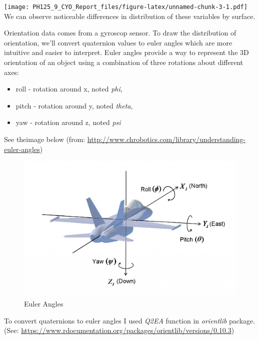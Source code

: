 \documentclass[]{article}
\providecommand{\tightlist}{%
  \setlength{\itemsep}{0pt}\setlength{\parskip}{0pt}}
\begin{document}
\texttt{[image: PH125\_9\_CYO\_Report\_files/figure-latex/unnamed-chunk-3-1.pdf]}
We can observe noticeable differences in distribution of these variables
by surface.

Orientation data comes from a gyroscop sensor. To draw the distribution
of orientation, we'll convert quaternion values to euler angles which
are more intuitive and easier to interpret. Euler angles provide a way
to represent the 3D orientation of an object using a combination of
three rotations about different axes:

\begin{itemize}
\tightlist
\item
  roll - rotation around x, noted \emph{phi},
\item
  pitch - rotation around y, noted \emph{theta},
\item
  yaw - rotation around z, noted \emph{psi}
\end{itemize}

See theimage below (from:
\url{http://www.chrobotics.com/library/understanding-euler-angles})

\begin{figure}
\includegraphics[width=0.6\linewidth]{image_euler_angles} \caption{Euler Angles}\label{fig:unnamed-chunk-4}
\end{figure}

To convert quaternions to euler angles I used \emph{Q2EA} function in
\emph{orientlib} package.(See:
\url{https://www.rdocumentation.org/packages/orientlib/versions/0.10.3})
\end{document}
